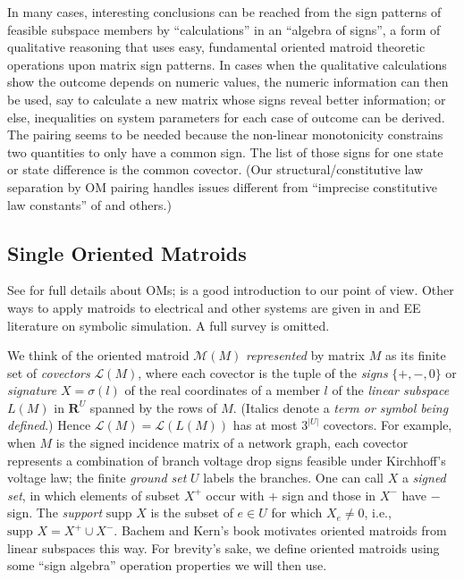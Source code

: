 \documentclass{article}
\def\Reals{\ensuremath{\mathbf R}}
\newcommand{\supp}[1]{{{\mbox{supp\ }#1}}}
\begin{document}
In many cases, interesting conclusions can be reached
from the sign patterns of feasible subspace members by 
``calculations'' in an ``algebra of signs'', a 
form of qualitative reasoning that uses
easy, fundamental oriented matroid theoretic 
operations 
upon matrix sign patterns.  In cases when
the qualitative calculations show the outcome depends on numeric
values, the numeric information can then be used, say to 
calculate a new matrix
whose signs reveal better information;
or else, inequalities
on system parameters for each case of outcome can be derived.  
The pairing seems to be needed because
the non-linear monotonicity
constrains two quantities to only have a common
sign. The list of those signs for one state or state difference
is the common covector.  (Our structural/constitutive law
separation by OM pairing handles issues different from
``imprecise constitutive law constants'' of \cite{Murota} and others.)

\subsection{Single Oriented Matroids}

See \cite{OMBOOK} for full details about OMs;
\cite{BachemKern} is a good introduction to our point of view.
Other ways to apply matroids to 
electrical and other systems are given in \cite{Recski,Murota,RigidityBook}
and EE literature on symbolic simulation.  A full survey is omitted.

We think of the oriented matroid $\mathcal{M}(M)$ 
\textit{represented} by matrix $M$ 
as its finite set of \textit{covectors} $\mathcal{L}(M)$, where
each covector 
is the tuple of the \textit{signs} $\{+,-,0\}$
or \textit{signature} $X=\sigma(l)$ of the real coordinates 
of a member $l$ of the \textit{linear subspace} $L(M)$ in $\Reals^U$
spanned by the rows of $M$. 
(Italics denote a 
\textit{term or symbol being defined}.)  Hence 
$\mathcal{L}(M)=\mathcal{L}(L(M))$ has at most 
$3^{|U|}$ covectors.  
For example,
when $M$ is the signed incidence matrix of a network graph, each covector
represents a combination of branch voltage drop 
signs feasible under Kirchhoff's
voltage law; the finite \textit{ground set} $U$ labels the branches.
One can call $X$ a \textit{signed set}, in
which elements of subset $X^+$ occur with $+$ sign and those in $X^-$ have
$-$ sign. 
The \textit{support} $\supp{X}$ is the subset
of $e\in U$ for which $X_e \neq 0$, i.e., $\supp{X}=X^+\cup X^-$.
Bachem and Kern's book \cite{BachemKern}
motivates oriented matroids from linear subspaces this way.
For brevity's sake,
we define oriented matroids 
using some ``sign algebra'' operation properties 
we will then use.
\end{document}
